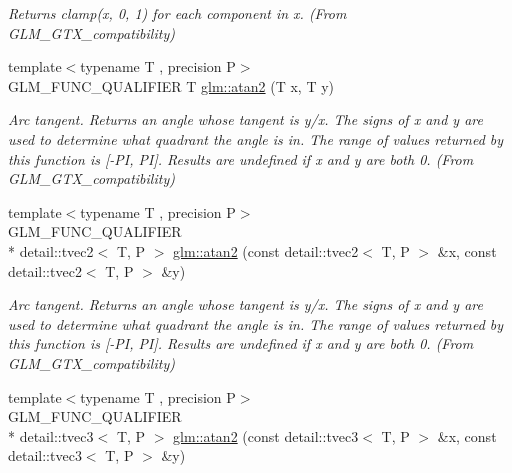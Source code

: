 \begin{DoxyCompactItemize}
\begin{DoxyCompactList}\small\item\em Returns clamp(x, 0, 1) for each component in x. (From G\-L\-M\-\_\-\-G\-T\-X\-\_\-compatibility) \end{DoxyCompactList}\item 
\hypertarget{group__gtx__compatibility_gac63011205bf6d0be82589dc56dd26708}{{\footnotesize template$<$typename T , precision P$>$ }\\G\-L\-M\-\_\-\-F\-U\-N\-C\-\_\-\-Q\-U\-A\-L\-I\-F\-I\-E\-R T \hyperlink{group__gtx__compatibility_gac63011205bf6d0be82589dc56dd26708}{glm\-::atan2} (T x, T y)}\label{group__gtx__compatibility_gac63011205bf6d0be82589dc56dd26708}

\begin{DoxyCompactList}\small\item\em Arc tangent. Returns an angle whose tangent is y/x. The signs of x and y are used to determine what quadrant the angle is in. The range of values returned by this function is \mbox{[}-\/\-P\-I, P\-I\mbox{]}. Results are undefined if x and y are both 0. (From G\-L\-M\-\_\-\-G\-T\-X\-\_\-compatibility) \end{DoxyCompactList}\item 
\hypertarget{group__gtx__compatibility_ga9947ea1e628e2823b9276924445e0147}{{\footnotesize template$<$typename T , precision P$>$ }\\G\-L\-M\-\_\-\-F\-U\-N\-C\-\_\-\-Q\-U\-A\-L\-I\-F\-I\-E\-R \\*
detail\-::tvec2$<$ T, P $>$ \hyperlink{group__gtx__compatibility_ga9947ea1e628e2823b9276924445e0147}{glm\-::atan2} (const detail\-::tvec2$<$ T, P $>$ \&x, const detail\-::tvec2$<$ T, P $>$ \&y)}\label{group__gtx__compatibility_ga9947ea1e628e2823b9276924445e0147}

\begin{DoxyCompactList}\small\item\em Arc tangent. Returns an angle whose tangent is y/x. The signs of x and y are used to determine what quadrant the angle is in. The range of values returned by this function is \mbox{[}-\/\-P\-I, P\-I\mbox{]}. Results are undefined if x and y are both 0. (From G\-L\-M\-\_\-\-G\-T\-X\-\_\-compatibility) \end{DoxyCompactList}\item 
\hypertarget{group__gtx__compatibility_gac457f8819be9cd8e3f42be17451b750a}{{\footnotesize template$<$typename T , precision P$>$ }\\G\-L\-M\-\_\-\-F\-U\-N\-C\-\_\-\-Q\-U\-A\-L\-I\-F\-I\-E\-R \\*
detail\-::tvec3$<$ T, P $>$ \hyperlink{group__gtx__compatibility_gac457f8819be9cd8e3f42be17451b750a}{glm\-::atan2} (const detail\-::tvec3$<$ T, P $>$ \&x, const detail\-::tvec3$<$ T, P $>$ \&y)}\label{group__gtx__compatibility_gac457f8819be9cd8e3f42be17451b750a}


\end{DoxyCompactItemize}
